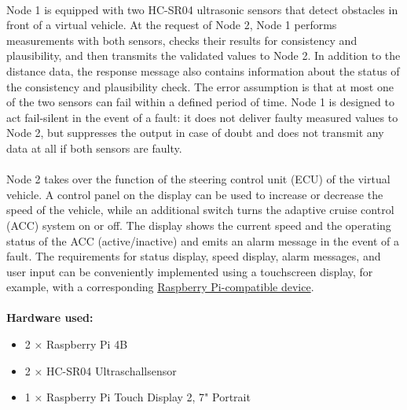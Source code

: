 \paragraph{}
Node 1 is equipped with two HC-SR04 ultrasonic sensors that detect obstacles in front of a virtual vehicle. At the request of Node 2, Node 1 performs measurements with both sensors, checks their results for consistency and plausibility, and then transmits the validated values to Node 2. In addition to the distance data, the response message also contains information about the status of the consistency and plausibility check. The error assumption is that at most one of the two sensors can fail within a defined period of time. Node 1 is designed to act fail-silent in the event of a fault: it does not deliver faulty measured values to Node 2, but suppresses the output in case of doubt and does not transmit any data at all if both sensors are faulty.

\paragraph{}
Node 2 takes over the function of the steering control unit (ECU) of the virtual vehicle. A control panel on the display can be used to increase or decrease the speed of the vehicle, while an additional switch turns the adaptive cruise control (ACC) system on or off. The display shows the current speed and the operating status of the ACC (active/inactive) and emits an alarm message in the event of a fault. The requirements for status display, speed display, alarm messages, and user input can be conveniently implemented using a touchscreen display, for example, with a corresponding \href{https://www.berrybase.at/raspberry-pi-touch-display-2-7-portrait} {Raspberry Pi-compatible device}. 


\paragraph{}
\textbf{Hardware used:}
\begin{itemize}
    \item 2 × Raspberry Pi 4B
    \item 2 × HC-SR04 Ultraschallsensor
    \item 1 × Raspberry Pi Touch Display 2, 7" Portrait
\end{itemize}
